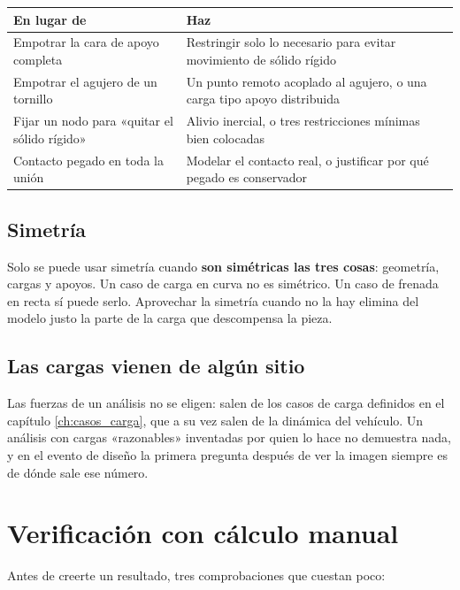 \begin{center}
\begin{tabularx}{\textwidth}{@{}XX@{}}
\toprule
\textbf{En lugar de} & \textbf{Haz} \\
\midrule
Empotrar la cara de apoyo completa & Restringir solo lo necesario para evitar
movimiento de sólido rígido \\
Empotrar el agujero de un tornillo & Un punto remoto acoplado al agujero, o una
carga tipo apoyo distribuida \\
Fijar un nodo para «quitar el sólido rígido» & Alivio inercial, o tres
restricciones mínimas bien colocadas \\
Contacto pegado en toda la unión & Modelar el contacto real, o justificar por qué
pegado es conservador \\
\bottomrule
\end{tabularx}
\end{center}

\subsection{Simetría}

Solo se puede usar simetría cuando \textbf{son simétricas las tres cosas}:
geometría, cargas y apoyos. Un caso de carga en curva no es simétrico. Un caso de
frenada en recta sí puede serlo. Aprovechar la simetría cuando no la hay elimina
del modelo justo la parte de la carga que descompensa la pieza.

\subsection{Las cargas vienen de algún sitio}

Las fuerzas de un análisis no se eligen: salen de los casos de carga definidos en
el capítulo \ref{ch:casos_carga}, que a su vez salen de la dinámica del vehículo.
Un análisis con cargas «razonables» inventadas por quien lo hace no demuestra
nada, y en el evento de diseño la primera pregunta después de ver la imagen
siempre es de dónde sale ese número.

\section{Verificación con cálculo manual}
\label{sec:elementos_finitos:04}

Antes de creerte un resultado, tres comprobaciones que cuestan poco:


